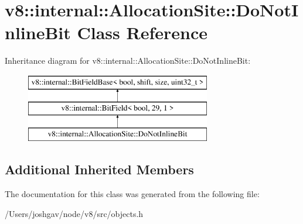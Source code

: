 \hypertarget{classv8_1_1internal_1_1_allocation_site_1_1_do_not_inline_bit}{}\section{v8\+:\+:internal\+:\+:Allocation\+Site\+:\+:Do\+Not\+Inline\+Bit Class Reference}
\label{classv8_1_1internal_1_1_allocation_site_1_1_do_not_inline_bit}
Inheritance diagram for v8\+:\+:internal\+:\+:Allocation\+Site\+:\+:Do\+Not\+Inline\+Bit\+:\begin{figure}[H]
\begin{center}
\leavevmode
\includegraphics[height=3.000000cm]{classv8_1_1internal_1_1_allocation_site_1_1_do_not_inline_bit}
\end{center}
\end{figure}
\subsection*{Additional Inherited Members}


The documentation for this class was generated from the following file\+:\begin{DoxyCompactItemize}
\item 
/\+Users/joshgav/node/v8/src/objects.\+h\end{DoxyCompactItemize}
